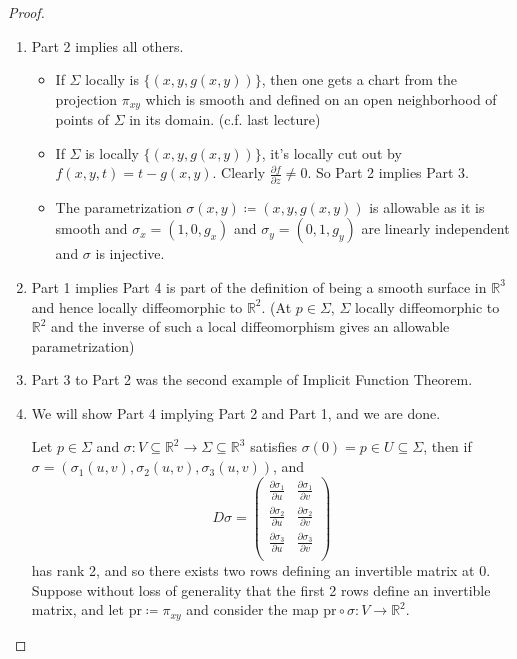 \begin{proof}
    \leavevmode
    \begin{enumerate}
        \item Part 2 implies all others.
        \begin{itemize}
            \item If \(\Sigma\) locally is \(\{(x,y,g(x,y))\}\), then one gets a chart from the projection \(\pi_{xy}\) which is smooth and defined on an open neighborhood of points of \(\Sigma\) in its domain. (c.f. last lecture)
            \item If \(\Sigma\) is locally \(\{(x, y, g(x,y))\}\), it's locally cut out by \(f(x,y,t) = t - g(x,y)\). Clearly \(\frac{\partial f}{\partial z} \neq 0\). So Part 2 implies Part 3.
            \item The parametrization \(\sigma(x,y)\coloneqq (x,y,g(x,y))\) is allowable as it is smooth and \(\sigma_x = (1,0,g_x)\) and \(\sigma_y = (0,1,g_y)\) are linearly independent and \(\sigma\) is injective.
        \end{itemize}
        \item Part 1 implies Part 4 is part of the definition of being a smooth surface in \(\mathbb{R}^3\) and hence locally diffeomorphic to \(\mathbb{R}^2\). (At \(p \in \Sigma\), \(\Sigma\) locally diffeomorphic to \(\mathbb{R}^2\) and the inverse of such a local diffeomorphism gives an allowable parametrization)
        \item Part 3 to Part 2 was the second example of Implicit Function Theorem.
        \item We will show Part 4 implying Part 2 and Part 1, and we are done.
        
        Let \(p \in \Sigma\) and \(\sigma:V \subseteq \mathbb{R}^2 \to \Sigma\subseteq \mathbb{R}^3\) satisfies \(\sigma(0) = p \in U \subseteq \Sigma\), then if \(\sigma = (\sigma_1(u,v), \sigma_2(u,v),\sigma_3(u,v))\), and
        \[
            D\sigma = \begin{pmatrix}
                \frac{\partial \sigma_1}{\partial u}  &  \frac{\partial \sigma_1}{\partial v}  \\
                \frac{\partial \sigma_2}{\partial u}  &\frac{\partial \sigma_2}{\partial v}    \\
                \frac{\partial \sigma_3}{\partial u}  & \frac{\partial \sigma_3}{\partial v}    \\
            \end{pmatrix}
        \]
        has rank 2, and so there exists two rows defining an invertible matrix at \(0\). Suppose without loss of generality that the first 2 rows define an invertible matrix, and let \(\mathrm{pr}\coloneqq \pi_{xy}\) and consider the map \(\mathrm{pr}\circ \sigma: V \to \mathbb{R}^2\).


\end{enumerate}
\end{proof}
